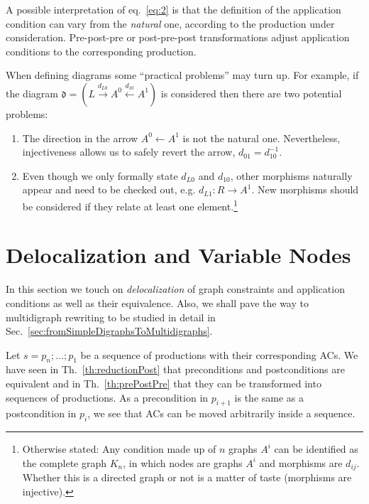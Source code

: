 \documentclass{fundam}
\begin{document}
A possible interpretation of eq.~\eqref{eq:2} is that the definition
of the application condition can vary from the \emph{natural} one,
according to the production under consideration. Pre-post-pre or
post-pre-post transformations adjust application conditions to the
corresponding production.

When defining diagrams some ``practical problems'' may turn up.  For
example, if the diagram $\mathfrak{d} = \left( L
  \stackrel{d_{L0}}{\rightarrow} A^0 \stackrel{d_{10}}{\leftarrow} A^1
\right)$ is considered then there are two potential problems:
\begin{enumerate}
\item The direction in the arrow $A^0 \leftarrow A^1$ is not the
  natural one.  Nevertheless, injectiveness allows us to safely revert
  the arrow, $d_{01} = d^{-1}_{10}$.
\item Even though we only formally state $d_{L0}$ and $d_{10}$, other
  morphisms naturally appear and need to be checked out, e.g. $d_{L1}:
  R \rightarrow A^1$.  New morphisms should be considered if they
  relate at least one element.\footnote{Otherwise stated: Any
    condition made up of $n$ graphs $A^i$ can be identified as the
    complete graph $K_n$, in which nodes are graphs $A^i$ and
    morphisms are $d_{ij}$.  Whether this is a directed graph or not
    is a matter of taste (morphisms are injective).}
\end{enumerate}

\section{Delocalization and Variable Nodes}
\label{sec:delocalization}


In this section we touch on \emph{delocalization} of graph constraints
and application conditions as well as their equivalence. Also, we
shall pave the way to multidigraph rewriting to be studied in detail
in Sec.~\ref{sec:fromSimpleDigraphsToMultidigraphs}.

Let $s = p_n; \ldots; p_1$ be a sequence of productions with their
corresponding ACs. We have seen in Th.~\ref{th:reductionPost} that
preconditions and postconditions are equivalent and in
Th.~\ref{th:prePostPre} that they can be transformed into sequences of
productions. As a precondition in $p_{i+1}$ is the same as a
postcondition in $p_i$, we see that ACs can be moved arbitrarily
inside a sequence.
\end{document}
